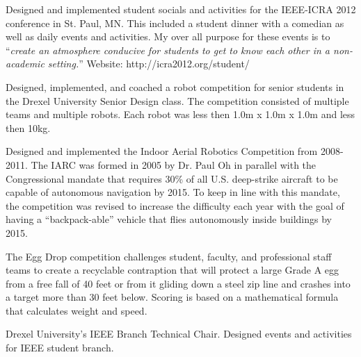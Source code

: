 \begin{resume}
\begin{position}
\end{position}

\begin{position}
Designed and implemented student socials and activities for the IEEE-ICRA 2012 conference in St. Paul, MN.  
This included a student dinner with a comedian as well as daily events and activities.    
My over all purpose for these events is to ``\textit{create an atmosphere conducive for students to get to know each other in a non-academic setting.}''
Website: http://icra2012.org/student/
\end{position}

\begin{position}
Designed, implemented, and coached a robot competition for senior students in the Drexel University Senior Design class.  The competition consisted of multiple teams and multiple robots.  Each robot was less then 1.0m x 1.0m x 1.0m and less then 10kg.
\end{position}

\begin{position}
Designed and implemented the Indoor Aerial Robotics Competition from 2008-2011.  The IARC was formed in 2005 by Dr. Paul Oh in parallel with the Congressional mandate that requires 30\% of all U.S. deep-strike aircraft to be capable of autonomous navigation by 2015. To keep in line with this mandate, the competition was revised to increase the difficulty each year with the goal of having a ``backpack-able'' vehicle that flies autonomously inside buildings by 2015. 
\end{position}

\begin{position}
The Egg Drop competition challenges student, faculty, and professional staff teams to create a recyclable contraption that will protect a large Grade A egg from a free fall of 40 feet or from it gliding down a steel zip line and crashes into a target more than 30 feet below. Scoring is based on a mathematical formula that calculates weight and speed.
\end{position}

\begin{position}
Drexel University's IEEE Branch Technical Chair.  Designed events and activities for IEEE student branch.
\end{position}


\end{resume}
